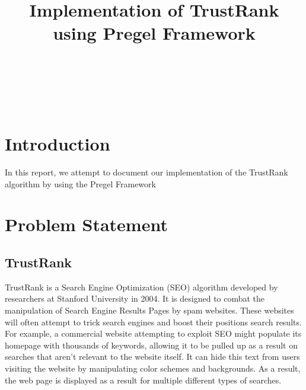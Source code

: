 \documentclass[conference]{IEEEtran}
\begin{document}
\title{Implementation of TrustRank using Pregel Framework}
    \author{
    \\\
    \and

    \and

    \\

    }

\maketitle

\section{Introduction}
In this report, we attempt to document our implementation of the TrustRank algorithm by using the Pregel Framework
\section{Problem Statement}

\subsection{TrustRank}
TrustRank is a Search Engine Optimization (SEO) algorithm developed by researchers at Stanford University in 2004. It is designed to combat the manipulation of Search Engine Results Pages by spam websites. These websites will often attempt to trick search engines and boost their positions search results. For example, a commercial website attempting to exploit SEO might populate its homepage with thousands of keywords, allowing it to be pulled up as a result on searches that aren't relevant to the website itself. It can hide this text from users visiting the website by manipulating color schemes and backgrounds. As a result, the web page is displayed as a result for multiple different types of searches.
\end{document}

